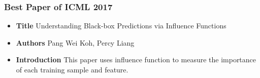 \documentclass[11pt]{beamer}
\begin{document}

\begin{frame}
    \frametitle{Best Paper of ICML 2017}
    \begin{itemize}
        \item \textbf{Title} Understanding Black-box Predictions via Influence Functions
        \item \textbf{Authors} Pang Wei Koh, Percy Liang
        \item \textbf{Introduction} This paper uses influence function to measure the importance of each training sample and feature. 
    \end{itemize}
\end{frame}
\end{document}

